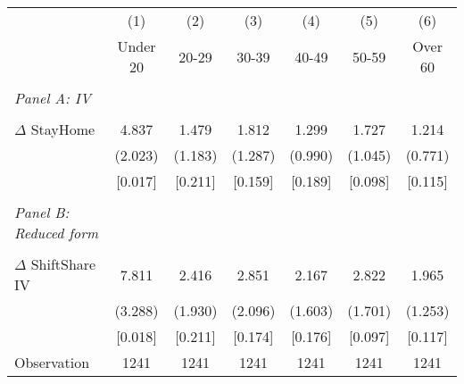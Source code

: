 \begin{tabular}{l*{6}{c}} \toprule
                    &\multicolumn{1}{c}{(1)}&\multicolumn{1}{c}{(2)}&\multicolumn{1}{c}{(3)}&\multicolumn{1}{c}{(4)}&\multicolumn{1}{c}{(5)}&\multicolumn{1}{c}{(6)}\\
                    &    Under 20&       20-29&       30-39&       40-49&       50-59&     Over 60\\
\hline \\ \multicolumn{1}{l}{\textit{Panel A: IV}} \\\\[-1ex]
$\Delta$ StayHome   &       4.837&       1.479&       1.812&       1.299&       1.727&       1.214\\
                    &     (2.023)&     (1.183)&     (1.287)&     (0.990)&     (1.045)&     (0.771)\\
                    &     [0.017]&     [0.211]&     [0.159]&     [0.189]&     [0.098]&     [0.115]\\
\hline \\ \multicolumn{1}{l}{\textit{Panel B: Reduced form}} \\\\[-1ex]
$\Delta$ ShiftShare IV&       7.811&       2.416&       2.851&       2.167&       2.822&       1.965\\
                    &     (3.288)&     (1.930)&     (2.096)&     (1.603)&     (1.701)&     (1.253)\\
                    &     [0.018]&     [0.211]&     [0.174]&     [0.176]&     [0.097]&     [0.117]\\
\hline
Observation         &        1241&        1241&        1241&        1241&        1241&        1241\\
\bottomrule \end{tabular}
